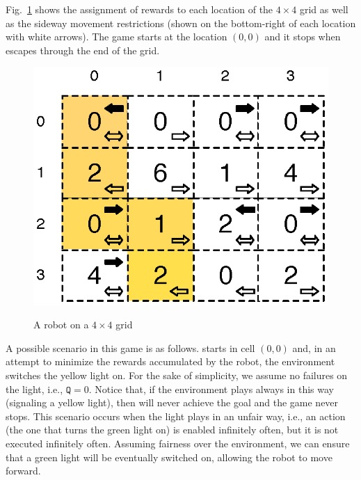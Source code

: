 Fig.~\ref{fig:robot_game_grid} shows the assignment of rewards to each location of the $4 \times 4$ grid as well as the sideway movement restrictions (shown on the bottom-right of each location with white arrows).
The game starts at the location $(0, 0)$ and it stops when \roborta escapes through the end of the grid.


\begin{figure}
\vspace{-9mm}
{\fontsize{6.6}{6.6}\selectfont\ttfamily
\centering
\includegraphics[scale=0.45]{Figs/robotMovesRewards.eps}\hspace{1em}\mbox{}}
\caption{A robot on a $4 \times 4$ grid} \label{fig:robot_game_grid}
\end{figure}
	A possible scenario in this game is as follows. \roborta starts in cell $(0,0)$ and, in an attempt to minimize the rewards accumulated by the robot, the environment switches the yellow light on.
	For the sake of simplicity, we assume no failures on the light, i.e., $\texttt{Q}=0$. 
	Notice that, if the environment plays always in this way (signaling a yellow light), then \roborta will never achieve the goal and 
the game never stops.  This scenario occurs when the light plays in an unfair way, i.e., an action (the one that turns the green light on) is enabled infinitely often, but it is not executed infinitely often.
	Assuming fairness over the environment, we can ensure that a green light will be eventually switched on, allowing the robot to move forward.

